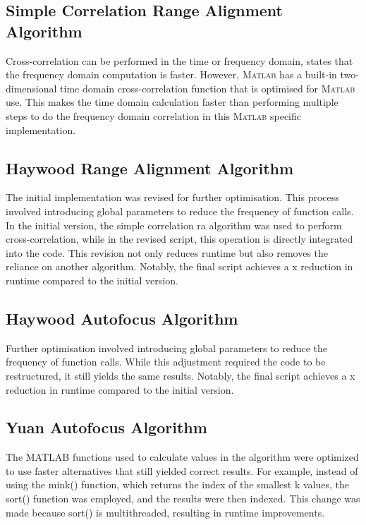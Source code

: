 \documentclass[class=report,11pt,crop=false]{standalone}
\begin{document}
    \subsection{Simple Correlation Range Alignment Algorithm}
    Cross-correlation can be performed in the time or frequency domain, \cite{ISARtextbook_Martorella} states that the frequency domain computation is faster. However, \textsc{Matlab} has a built-in two-dimensional time domain cross-correlation function that is optimised for \textsc{Matlab} use. This makes the time domain calculation faster than performing multiple steps to do the frequency domain correlation in this \textsc{Matlab} specific implementation. 
    
    \subsection{Haywood Range Alignment Algorithm}
    The initial implementation was revised for further optimisation. This process involved introducing global parameters to reduce the frequency of function calls.  In the initial version, the simple correlation \gls{ra} algorithm was used to perform cross-correlation, while in the revised script, this operation is directly integrated into the code. This revision not only reduces runtime but also removes the reliance on another algorithm. Notably, the final script achieves a x reduction in runtime compared to the initial version.
    
    \subsection{Haywood Autofocus Algorithm}
    Further optimisation involved introducing global parameters to reduce the frequency of function calls. While this adjustment required the code to be restructured, it still yields the same results. Notably, the final script achieves a x reduction in runtime compared to the initial version.

    \subsection{Yuan Autofocus Algorithm}
    The \textsc{MATLAB} functions used to calculate values in the algorithm were optimized to use faster alternatives that still yielded correct results. For example, instead of using the mink() function, which returns the index of the smallest k values, the sort() function was employed, and the results were then indexed. This change was made because sort() is multithreaded, resulting in runtime improvements.
    
\end{document}
